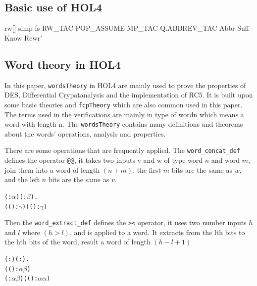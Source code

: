 \documentclass{article}
\begin{document}
\subsection{Basic use of HOL4}
rw[] simp fs
RW_TAC
POP_ASSUME MP_TAC
Q.ABBREV_TAC Abbr
Suff Know Rewr'

\subsection{Word theory in HOL4}
In this paper, \verb|wordsTheory| in HOL4 are mainly used to prove the properties of DES, Differential Crypatanalysis
and the implementation of RC5. It is built upon some basic theories and \verb|fcpTheory| which are also common used in
this paper. The terms used in the verifications are mainly in type of wordn which means a word with length n.
The \verb|wordsTheory| contains many definitions and theorems about the words' operations, analysis and properties.

There are some operations that are frequently applied. The \verb|word_concat_def| defines the operator \verb|@@|, it takes two
inputs v and w of type word $n$ and word $m$, join them into a word of length $(n+m)$, the first $m$ bits are the same as $w$,
and the left $n$ bits are the same as $v$.

\begin{alltt}
\HOLTokenTurnstile{} \HOLSymConst{\HOLTokenForall{}}( :\ensuremath{\alpha} ) ( :\ensuremath{\beta} ).
     ((  ) :\ensuremath{\gamma} ) \HOLSymConst{=} ( (  ) :\ensuremath{\gamma} )
\end{alltt}

Then the \verb|word_extract_def| defines the \verb|><| operator, it uses two number inputs $h$ and $l$ where $(h>l)$, and is applied
to a word. It extracts from the lth bits to the hth bits of the word, result a word of length $(h-l+1)$

\begin{alltt}
\HOLTokenTurnstile{} \HOLSymConst{\HOLTokenForall{}}( :) ( :).
     (( \HOLSymConst{\HOLTokenExtract{}} ) :\ensuremath{\alpha}  \HOLTokenMap{} \ensuremath{\beta} ) \HOLSymConst{=}
     ( :\ensuremath{\alpha}  \HOLTokenMap{} \ensuremath{\beta} ) \HOLSymConst{\HOLTokenCompose} (( \HOLSymConst{--} ) :\ensuremath{\alpha}  \HOLTokenMap{} \ensuremath{\alpha} )
\end{alltt}
\end{document}
